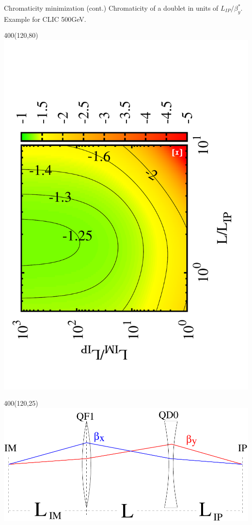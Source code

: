 \documentclass{beamer}
\begin{document}
\begin{frame}{Chromaticity minimization (cont.)}
\vspace*{8cm}
{\tiny Chromaticity of a doublet in units of $L_{IP}/\beta^*_y$. Example for CLIC 500GeV.}\par
 \setlength{\TPHorizModule}{1pt}
  \setlength{\TPVertModule}{1pt}
  \begin{textblock}{400}(120,80)
 \includegraphics[scale=0.40,angle=-90]{chromHV_500GeVa.pdf}
\end{textblock}
\begin{textblock}{400}(120,25)
 \includegraphics[scale=0.25,angle=0]{fig01.pdf}

\end{textblock}
\end{frame}
\end{document}
